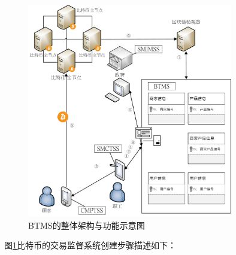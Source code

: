 	\begin{figure}[!htbp]
		\centering
		\includegraphics[width = 0.8\textwidth]{fig4.jpg}
		\caption{BTMS的整体架构与功能示意图}\label{fig4}
	\end{figure}

	图\ref{fig4}比特币的交易监督系统创建步骤描述如下：

